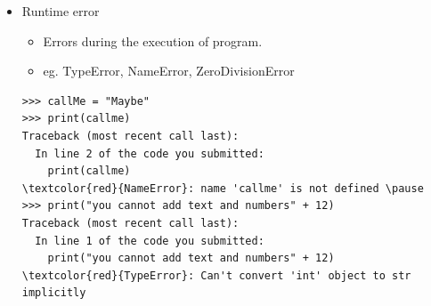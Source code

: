 \documentclass[xcolor=x11names,compress]{beamer}
\renewcommand{\(}{\begin{columns}}
\renewcommand{\)}{\end{columns}}
\newcommand{\<}[1]{\begin{column}{#1}}
\renewcommand{\>}{\end{column}}
\begin{document}
\begin{frame}[fragile]
\begin{itemize}
	\item \textcolor{redwine}{Runtime error}
  \begin{itemize}
  	\item Errors during the execution of program. 
	\item eg. TypeError, NameError, ZeroDivisionError \pause
 \end{itemize}
 \begin{footnotesize}
  \begin{Verbatim}[commandchars=\\\{\}]
>>> callMe = "Maybe"
>>> print(callme)
Traceback (most recent call last):
  In line 2 of the code you submitted:
    print(callme)
\textcolor{red}{NameError}: name 'callme' is not defined \pause
>>> print("you cannot add text and numbers" + 12)
Traceback (most recent call last):
  In line 1 of the code you submitted:
    print("you cannot add text and numbers" + 12)
\textcolor{red}{TypeError}: Can't convert 'int' object to str implicitly
\end{Verbatim}	
 \end{footnotesize}
 \end{itemize}
\end{frame}

\end{document}
